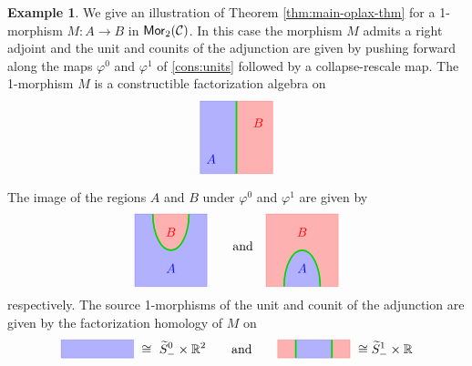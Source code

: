 \documentclass[10pt, reqno, twoside
, final
]{amsart}
\numberwithin{equation}{subsection}%
\theoremstyle{definition}
\theoremstyle{definition}
\theoremstyle{definition}
\theoremstyle{definition}
\theoremstyle{definition}
\theoremstyle{definition}
\theoremstyle{definition}
\theoremstyle{definition}
\theoremstyle{definition}
\theoremstyle{plain}
\theoremstyle{definition}
\theoremstyle{plain}
\theoremstyle{definition}
\theoremstyle{plain}
\theoremstyle{definition}
\theoremstyle{definition}
\theoremstyle{plain}
\theoremstyle{plain}
\theoremstyle{definition}
\newtheorem{ex}[defn]{Example}
\theoremstyle{plain}
\theoremstyle{plain}
\theoremstyle{plain}
\begin{document}
\begin{ex}
We give an illustration of Theorem \ref{thm:main-oplax-thm} for a 1-morphism $M:A\to B$ in $\mathsf{Mor}_2(\mathcal{C})$. In this case the morphism $M$ admits a right adjoint and the unit and counits of the adjunction are given by pushing forward along the maps $\varphi^0$ and $\varphi^1$ of \cref{cons:units} followed by a collapse-rescale map. The 1-morphism $M$ is a constructible factorization algebra on
\[\begin{tikzpicture} 
\filldraw[blue,opacity=0.3] (1,0) -- (0,0) -- (0,2)--(1,2);
\filldraw[red,opacity=0.3] (1,0) -- (2,0) -- (2,2)--(1,2);
\draw[very thick, green!85!black] (1,0) -- (1,2);
\node[blue] at (0.3,0.4) {$A$};
\node[red] at (1.6,1.4) {$B$};
\end{tikzpicture}\]
The image of the regions $A$ and $B$ under $\varphi^0$ and $\varphi^1$ are given by
\[\begin{tikzpicture}[baseline = 1cm]
\filldraw[blue,opacity=0.3] (0.5,2) -- (0,2) -- (0,0) -- (2,0) -- (2,2) -- (1.5,2) arc (0:-180:0.5 and 1);
\filldraw[red,opacity=0.3] (0.5,2) -- (1.5,2) arc (0:-180:0.5 and 1);
\draw[very thick, green!85!black] (1.5,2) arc (0:-180:0.5 and 1);
\node[blue] at (1,0.5) {$A$};
\node[red] at (1,1.5) {$B$};
\end{tikzpicture} \qquad \text{and} \quad \begin{tikzpicture}[baseline = 1cm]
\filldraw[blue,opacity=0.3](0.5,0) -- (1.5,0)arc (0:180:0.5 and 1);
\filldraw[red,opacity=0.3]  (0.5,0) -- (0,0) -- (0,2) -- (2,2) -- (2,0) -- (1.5,0) arc (0:180:0.5 and 1);
\draw[very thick, green!85!black] (1.5,0) arc (0:180:0.5 and 1);
\node[blue] at (1,0.5) {$A$};
\node[red] at (1,1.5) {$B$};
\end{tikzpicture} \]
respectively. The source 1-morphisms of the unit and counit of the adjunction are given by the factorization homology of $M$ on
\begin{equation*}
    \begin{tikzpicture}[baseline=0.13cm]
\filldraw[blue,opacity=0.3] (0,0) rectangle (2,0.5);
\end{tikzpicture} \ \cong\  \widetilde{S}^0_{-} \times \R^2 \qquad \text{and} \qquad  
\begin{tikzpicture}[baseline=0.13cm]
\filldraw[red,opacity=0.3] (0,0) rectangle (0.5,0.5);
\filldraw[red,opacity=0.3] (1.5,0) rectangle (2,0.5);
\filldraw[blue,opacity=0.3] (0.5,0) rectangle (1.5,0.5);
\draw[very thick, green!85!black] (0.5,0) -- (0.5,0.5);
\draw[very thick, green!85!black](1.5,0) -- (1.5,0.5);
\end{tikzpicture}\  \cong \widetilde{S}^1_{-} \times \R

\end{equation*}
\end{ex}
\end{document}

